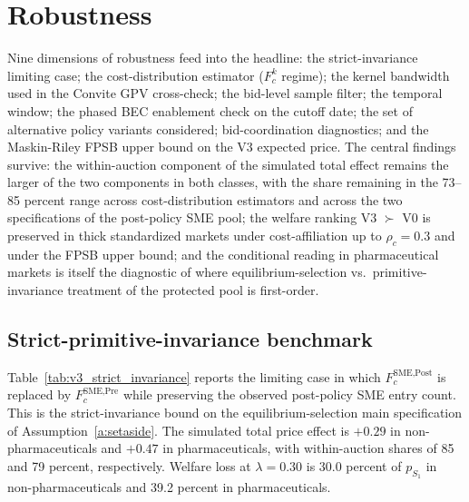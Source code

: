 \section{Robustness}\label{sec:robustness}

Nine dimensions of robustness feed into the headline: the strict-invariance limiting case; the cost-distribution estimator ($F_c^k$ regime); the kernel bandwidth used in the Convite GPV cross-check; the bid-level sample filter; the temporal window; the phased BEC enablement check on the cutoff date; the set of alternative policy variants considered; bid-coordination diagnostics; and the Maskin-Riley FPSB upper bound on the V3 expected price. The central findings survive: the within-auction component of the simulated total effect remains the larger of the two components in both classes, with the share remaining in the 73--85 percent range across cost-distribution estimators and across the two specifications of the post-policy SME pool; the welfare ranking V3 $\succ$ V0 is preserved in thick standardized markets under cost-affiliation up to $\rho_c = 0.3$ and under the FPSB upper bound; and the conditional reading in pharmaceutical markets is itself the diagnostic of where equilibrium-selection vs.\ primitive-invariance treatment of the protected pool is first-order.

\subsection{Strict-primitive-invariance benchmark}

Table~\ref{tab:v3_strict_invariance} reports the limiting case in which $F_c^{\text{SME,Post}}$ is replaced by $F_c^{\text{SME,Pre}}$ while preserving the observed post-policy SME entry count. This is the strict-invariance bound on the equilibrium-selection main specification of Assumption~\ref{a:setaside}. The simulated total price effect is $+0.29$ in non-pharmaceuticals and $+0.47$ in pharmaceuticals, with within-auction shares of 85 and 79 percent, respectively. Welfare loss at $\lambda = 0.30$ is 30.0 percent of $p_{S_1}$ in non-pharmaceuticals and 39.2 percent in pharmaceuticals.

